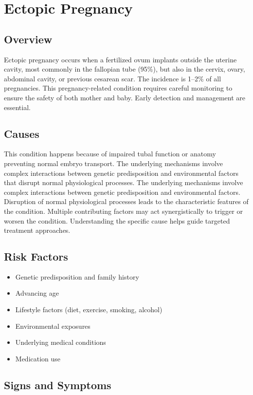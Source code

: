 \chapter{Ectopic Pregnancy}
\label{sec:Ectopic Pregnancy}

\section{Overview}
Ectopic pregnancy occurs when a fertilized ovum implants outside the uterine cavity, most commonly in the fallopian tube (95\%), but also in the cervix, ovary, abdominal cavity, or previous cesarean scar. The incidence is 1--2\% of all pregnancies. This pregnancy-related condition requires careful monitoring to ensure the safety of both mother and baby. Early detection and management are essential.
\section{Causes}
This condition happens because of impaired tubal function or anatomy preventing normal embryo transport. The underlying mechanisms involve complex interactions between genetic predisposition and environmental factors that disrupt normal physiological processes. The underlying mechanisms involve complex interactions between genetic predisposition and environmental factors. Disruption of normal physiological processes leads to the characteristic features of the condition. Multiple contributing factors may act synergistically to trigger or worsen the condition. Understanding the specific cause helps guide targeted treatment approaches.
\section{Risk Factors}


\begin{itemize}[noitemsep]
  \item Genetic predisposition and family history
  \item Advancing age
  \item Lifestyle factors (diet, exercise, smoking, alcohol)
  \item Environmental exposures
  \item Underlying medical conditions
  \item Medication use
\end{itemize}
\section{Signs and Symptoms}

